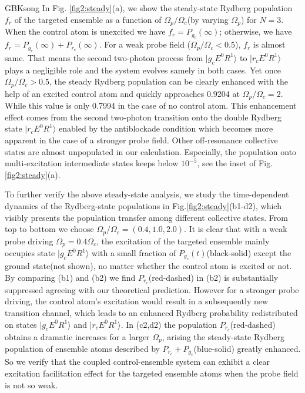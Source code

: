 \documentclass{cpbtex}
\begin{document}
\begin{CJK*}{GBK}{song}
In Fig. \ref{fig2:steady}(a), we show the steady-state Rydberg population $f_r$ of the targeted ensemble as a function of $\Omega_p/\Omega_c$(by varying $\Omega_p$) for $N=3$. When the control atom is unexcited we have $f_r = P_{g_c}(\infty)$; otherwise, we have $f_r = P_{g_c}(\infty)+P_{r_c}(\infty)$. For a weak probe field ($\Omega_p/\Omega_c < 0.5$), $f_r$ is almost same. That means the second two-photon process from $|g_cE^0R^1\rangle$ to $|r_cE^0R^1\rangle$ plays a negligible role and the system evolves samely in both cases. Yet 
once $\Omega_p/\Omega_c>0.5$, the steady Rydberg population can be clearly enhanced with the help of an excited control atom and quickly approaches 0.9204 at $\Omega_p/\Omega_c= 2$. While this value is only 0.7994 in the case of no control atom.
This enhancement effect comes from the second two-photon transition onto the double Rydberg state $|r_cE^0R^1\rangle$ enabled by the antiblockade condition which becomes more apparent in the case of a stronger probe field.
Other off-resonance collective states are almost unpopulated in our calculation. Especially, the population onto multi-excitation intermediate states keeps below $10^{-5}$, see the inset of Fig.\ref{fig2:steady}(a).


To further verify the above steady-state analysis, we study the time-dependent dynamics of the Rydberg-state populations in Fig.\ref{fig2:steady}(b1-d2), which visibly presents the population transfer among different collective states. From top to bottom we choose $\Omega_p/\Omega_c=(0.4,1.0,2.0)$. It is clear that with a weak probe driving $\Omega_p=0.4\Omega_c$, the excitation of the targeted ensemble mainly occupies state $|g_cE^0R^1\rangle$ with a small fraction of $P_{g_c}(t)$(black-solid) except the ground state(not shown), no matter whether the control atom is excited or not. By comparing (b1) and (b2) we find $P_{r_c}$(red-dashed) in (b2) is substantially suppressed agreeing with our theoretical prediction.
However for a stronger probe driving, the control atom's excitation would result in a subsequently new transition channel, which leads to an enhanced Rydberg probability redistributed on states $|g_cE^0R^1\rangle$ and $|r_cE^0R^1\rangle$. In (c2,d2) the population $P_{r_c}$(red-dashed) obtains a dramatic increases for a larger $\Omega_p$, arising the steady-state Rydberg population of ensemble atoms described by $P_{r_c}+P_{g_c}$(blue-solid) greatly enhanced. So we verify that the coupled control-ensemble system can exhibit a clear excitation facilitation effect for the targeted ensemble atoms when the probe field is not so weak. 



\end{CJK*}
\end{document}
